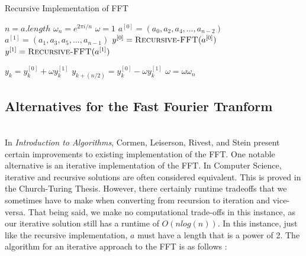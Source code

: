 \documentclass{amsproc}
\begin{document}
\begin{algorithm}
\caption{Recursive Implementation of FFT}\label{fft}
\begin{algorithmic}[1]
 
\State $n = a.length$
  
\EndIf
\State $\omega_n = e^{2\pi i / n}$ 
\State $\omega = 1$
\State $a^{[0]} = (a_0, a_2, a_4, ..., a_{n-2})$ 
\State $a^{[1]} = (a_1, a_3, a_5, ..., a_{n-1})$
\State $y^{[0]} = \Call{Recursive-FFT}{a^{[0]}}$ 
\State $y^{[1]} = \Call{Recursive-FFT}{a^{[1]}}$

	\State $y_k = y_k^{[0]} + \omega y_k^{[1]}$ 
	\State $y_{k+(n/2)} = y_k^{[0]} - \omega y_k^{[1]}$
	\State $\omega = \omega \omega_n$ 
\EndFor

\State {} 

\EndProcedure
\end{algorithmic}
\end{algorithm}

\subsection{Alternatives for the Fast Fourier Tranform}

\mbox{}	 \\
\indent In \textit{Introduction to Algorithms}, Cormen, Leiserson, Rivest, and Stein present certain improvements to existing implementation of the FFT. One notable alternative is an iterative implementation of the FFT. In Computer Science, iterative and recursive solutions are often considered equivalent. This is proved in the Church-Turing Thesis. However, there certainly runtime tradeoffs that we sometimes have to make when converting from recursion to iteration and vice-versa. That being said, we make no computational trade-offs in this instance, as our iterative solution still has a runtime of $O(nlog(n))$. In this instance, just like the recursive implementation, $a$ must have a length that is a power of 2. The algorithm for an iterative approach to the FFT is as follows \cite{Cormen}:
\end{document}
